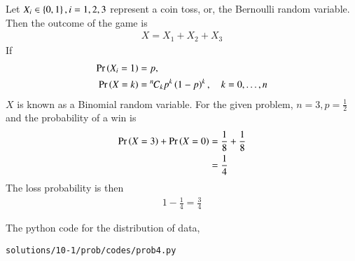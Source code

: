 Let $X_i\in \left\{0,1\right\}, i = 1, 2, 3$ represent a coin toss, or, the Bernoulli random variable.  Then the outcome of the game is
\begin{align}
X = X_1+X_2+X_3	
\end{align}
If 
\begin{align}
\Pr\left(X_i = 1\right) &= p,
\\
\Pr\left(X = k\right) &= {{}^{n}\mkern-1muC_{k}}p^k\left(1-p\right)^k, \quad k = 0,\dots, n
\end{align}
$X$ is known as a Binomial random variable.  For the given problem, $n = 3, p = \frac{1}{2}$ and the probability of a win is 
\begin{align}
\Pr\left(X = 3\right) + \Pr\left(X = 0\right) &= \frac{1}{8}+\frac{1}{8}
\\
&= \frac{1}{4}
\end{align}
The loss probability is then
\begin{align}
1-\frac{1}{4} = \frac{3}{4}
\end{align}

The python code for the distribution of data,
\begin{lstlisting}
solutions/10-1/prob/codes/prob4.py
\end{lstlisting}

